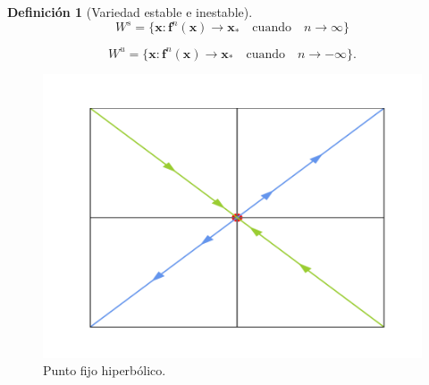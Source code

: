 \documentclass[11pt]{beamer}
\theoremstyle{definition}
\newtheorem{defn}{Definici\'on}[Definition]
\begin{document}
\begin{frame}
\begin{defn}[Variedad estable e inestable]
\begin{equation}
W^{s}=\lbrace \mathbf{x} : \mathbf{f}^{n}(\mathbf{x})\rightarrow \mathbf{x}_{*} \quad \mathrm{cuando} \quad n\rightarrow \infty \rbrace
\label{variedad estable}
\end{equation}

\begin{equation}
W^{u}=\lbrace \mathbf{x} : \mathbf{f}^{n}(\mathbf{x})\rightarrow \mathbf{x}_{*} \quad \mathrm{cuando} \quad n\rightarrow -\infty \rbrace.
\label{variedad inestable}
\end{equation}

\end{defn}

\begin{figure}
\centering
\includegraphics[scale=0.4]{hyperbolic2.pdf}
\caption{Punto fijo hiperb\'olico.}
\label{hiperbolico}
\end{figure}

\end{frame}
\end{document}
